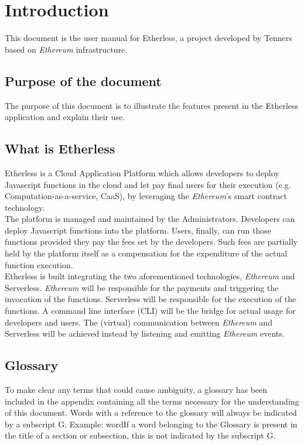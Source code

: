 \section{Introduction}
This document is the user manual for Etherless, a project developed by Tenners based on \textit{Ethereum\glo} infrastructure.

\subsection{Purpose of the document}
The purpose of this document is to illustrate the features present in the Etherless application and explain their use.

\subsection{What is Etherless}
Etherless is a Cloud Application Platform which allows developers to deploy Javascript functions in the cloud and let pay final users for their execution (e.g. Computation-as-a-service, CaaS), by leveraging the \textit{Ethereum\glos}'s smart contract technology.\\
The platform is managed and maintained by the Administrators. 
Developers can deploy Javascript functions into the platform. Users, finally, can run those functions provided they pay the fees set by the developers. Such fees are partially held by the platform itself as a compensation for the expenditure of the actual function execution.\\
Etherless is built integrating the two aforementioned technologies, \textit{Ethereum\glo} and Serverless. \textit{Ethereum\glo} will be responsible for the payments and triggering the invocation of the functions. Serverless will be responsible for the execution of the functions. A command line interface (CLI) will be the bridge for actual usage for developers and users. The (virtual) communication between \textit{Ethereum\glo} and Serverless will be achieved instead by listening and emitting \textit{Ethereum\glo} events. 


\subsection{Glossary}
To make clear any terms that could cause ambiguity, a glossary has been included in the appendix containing all the terms necessary for the understanding of this document. Words with a reference to the glossary will always be indicated by a subscript G. Example: word\glo If a word belonging to the Glossary is present in the title of a section or subsection, this is not indicated by the subscript G.
